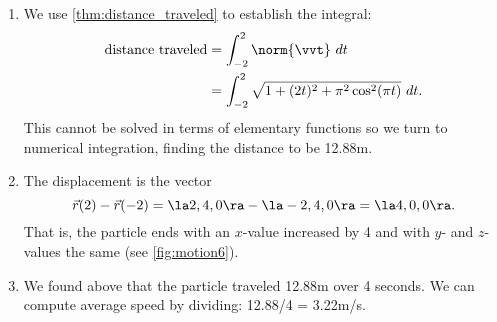 {\begin{enumerate}
	\item We use \autoref{thm:distance_traveled} to establish the integral:
	\begin{align*}
	\text{distance traveled} &= \int_{-2}^2 \norm{\vvt}\ dt \\
							&= \int_{-2}^2 \sqrt{1+(2t)^2+ \pi^2\cos^2(\pi t)}\ dt.
	\end{align*}
	This cannot be solved in terms of elementary functions so we turn to numerical integration, finding the distance to be 12.88m.
		
	\item		The displacement is the vector $$\vec r(2)-\vec r(-2) = \la 2,4,0\ra - \la -2,4,0\ra = \la 4,0,0\ra.$$ That is, the particle ends with an $x$-value increased by 4 and with $y$- and $z$-values the same (see \autoref{fig:motion6}).
	
	\item		We found above that the particle traveled 12.88m over 4 seconds. We can compute average speed by dividing: 12.88/4 = 3.22m/s. 
	

\end{enumerate}}
